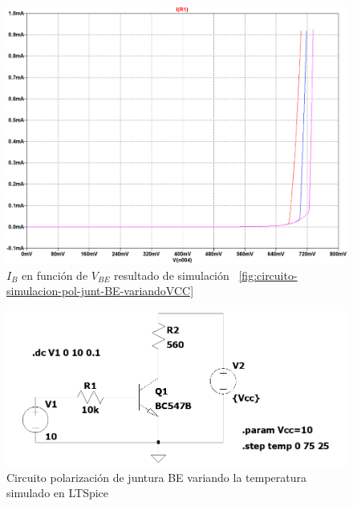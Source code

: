 \documentclass[chaptersright]{informeutn}
\begin{document}
    \begin{figure}[H]
        \centering
        \includegraphics[width=1\textwidth, keepaspectratio]{pictures/curva-simulacion-pol-junt-be-variandoVCC.png}
        \caption{$I_B$ en función de $V_{BE}$ resultado de simulación
        ~\ref{fig:circuito-simulacion-pol-junt-BE-variandoVCC}}
    \end{figure}

    \begin{figure}[H]
        \centering
        \includegraphics[width=1\textwidth, keepaspectratio]{pictures/circuito-simulacion-pol-junt-be-variandoTEMP.png}
        \caption{Circuito polarización de juntura BE variando la temperatura simulado en LTSpice}
        \label{fig:circuito-simulacion-pol-junt-BE-variandoTEMP}
    \end{figure}
\end{document}
